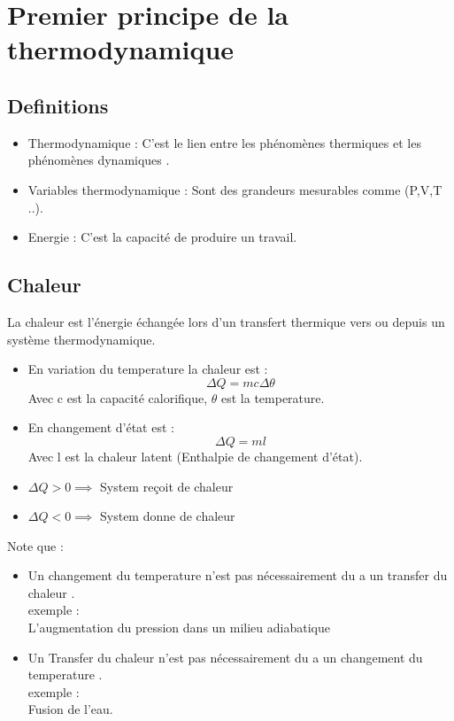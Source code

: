 \documentclass[12pt,oneside]{book}
\begin{document}



\chapter{Premier principe de la thermodynamique}
\section{Definitions}
\begin{itemize}
    \item Thermodynamique : C'est le lien entre les phénomènes thermiques et les phénomènes dynamiques .
    \item Variables thermodynamique : Sont des grandeurs mesurables comme (P,V,T ..).
    \item Energie : C'est la capacité de produire un travail.
\end{itemize}
\section{Chaleur}
La chaleur est l’énergie échangée lors d'un transfert thermique vers ou depuis un système thermodynamique.\\
\begin{itemize}
    \item En variation du temperature la chaleur est :
          \[\boxed{\Delta Q = mc\Delta \theta}\]
          Avec c est la capacité calorifique, $\theta $ est la temperature.
    \item En changement d’état est :
          \[\boxed{\Delta Q = ml}\]
          Avec l est la chaleur latent (Enthalpie de changement d'état).
\end{itemize}
\begin{itemize}
    \item $\Delta Q > 0  \implies $ System reçoit de chaleur
    \item $ \Delta Q < 0 \implies $ System donne de chaleur
\end{itemize}
Note que :
\begin{itemize}
    \item Un changement du temperature n'est pas nécessairement du a un transfer du chaleur .\\
          exemple :\\
          L'augmentation du pression dans un milieu adiabatique
    \item Un Transfer du chaleur n'est pas nécessairement du a un changement du temperature . \\
          exemple : \\
          Fusion de l'eau.
\end{itemize}
\end{document}
